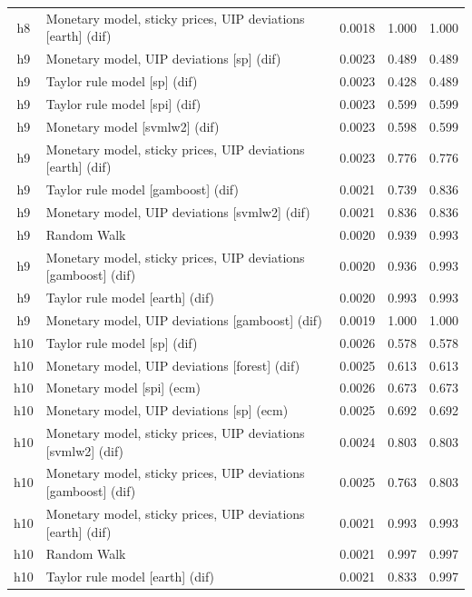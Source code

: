 \begin{ThreePartTable}
\begin{longtable}[t]{cp{5.5cm}ccc}
h8 & \raggedright Monetary model, sticky prices, UIP deviations [earth] (dif) & 0.0018 & 1.000 & 1.000\\
\addlinespace
h9 & \raggedright Monetary model, UIP deviations [sp] (dif) & 0.0023 & 0.489 & 0.489\\
h9 & \raggedright Taylor rule model [sp] (dif) & 0.0023 & 0.428 & 0.489\\
h9 & \raggedright Taylor rule model [spi] (dif) & 0.0023 & 0.599 & 0.599\\
h9 & \raggedright Monetary model [svmlw2] (dif) & 0.0023 & 0.598 & 0.599\\
h9 & \raggedright Monetary model, sticky prices, UIP deviations [earth] (dif) & 0.0023 & 0.776 & 0.776\\
h9 & \raggedright Taylor rule model [gamboost] (dif) & 0.0021 & 0.739 & 0.836\\
h9 & \raggedright Monetary model, UIP deviations [svmlw2] (dif) & 0.0021 & 0.836 & 0.836\\
h9 & \raggedright Random Walk & 0.0020 & 0.939 & 0.993\\
h9 & \raggedright Monetary model, sticky prices, UIP deviations [gamboost] (dif) & 0.0020 & 0.936 & 0.993\\
h9 & \raggedright Taylor rule model [earth] (dif) & 0.0020 & 0.993 & 0.993\\
h9 & \raggedright Monetary model, UIP deviations [gamboost] (dif) & 0.0019 & 1.000 & 1.000\\
\addlinespace
h10 & \raggedright Taylor rule model [sp] (dif) & 0.0026 & 0.578 & 0.578\\
h10 & \raggedright Monetary model, UIP deviations [forest] (dif) & 0.0025 & 0.613 & 0.613\\
h10 & \raggedright Monetary model [spi] (ecm) & 0.0026 & 0.673 & 0.673\\
h10 & \raggedright Monetary model, UIP deviations [sp] (ecm) & 0.0025 & 0.692 & 0.692\\
h10 & \raggedright Monetary model, sticky prices, UIP deviations [svmlw2] (dif) & 0.0024 & 0.803 & 0.803\\
h10 & \raggedright Monetary model, sticky prices, UIP deviations [gamboost] (dif) & 0.0025 & 0.763 & 0.803\\
h10 & \raggedright Monetary model, sticky prices, UIP deviations [earth] (dif) & 0.0021 & 0.993 & 0.993\\
h10 & \raggedright Random Walk & 0.0021 & 0.997 & 0.997\\
h10 & \raggedright Taylor rule model [earth] (dif) & 0.0021 & 0.833 & 0.997\\

\end{longtable}
\end{ThreePartTable}
